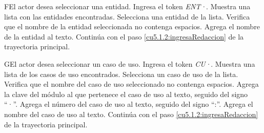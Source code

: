  \begin{UCtrayectoriaA}{F}{El actor desea seleccionar una entidad.}
 	\UCpaso[\UCactor] Ingresa el token {\it ENT·}.	
 	\UCpaso[\UCsist] Muestra una lista con las entidades encontradas.
 	\UCpaso[\UCactor] Selecciona una entidad de la lista.
  	\UCpaso[\UCsist] Verifica que el nombre de la entidad seleccionada no contenga espacios. 
  	\UCpaso[\UCsist] Agrega el nombre de la entidad al texto.
    \UCpaso[] Continúa con el paso \ref{cu5.1.2:ingresaRedaccion} de la trayectoria principal.
 \end{UCtrayectoriaA}
 \begin{UCtrayectoriaA}{G}{El actor desea seleccionar un caso de uso.}
 	\UCpaso[\UCactor] Ingresa el token {\it CU·}.
  	\UCpaso[\UCsist] Muestra una lista de los casos de uso encontrados.
 	\UCpaso[\UCactor] Selecciona un caso de uso de la lista.
  	\UCpaso[\UCsist] Verifica que el nombre del caso de uso seleccionado no contenga espacios. 
  	\UCpaso[\UCsist] Agrega la clave del módulo al que pertenece el caso de uso al texto, seguido del signo ``·''.
  	\UCpaso[\UCsist] Agrega el número del caso de uso al texto, seguido del signo ``:''.
  	\UCpaso[\UCsist] Agrega el nombre del caso de uso al texto.
    \UCpaso[] Continúa con el paso \ref{cu5.1.2:ingresaRedaccion} de la trayectoria principal.
 \end{UCtrayectoriaA}
 
